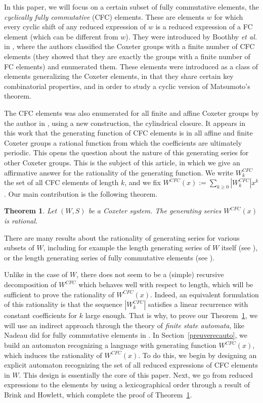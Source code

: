 \documentclass[reqno,12pt]{amsart}
\newtheorem{Theorem}{Theorem}[section]
\theoremstyle{definition}
\begin{document}
 In this paper, we will focus on a certain subset of fully commutative elements, the \emph{cyclically fully commutative} (CFC) elements. These are elements $w$ for which every cyclic shift of any reduced expression of $w$ is a reduced expression of a FC element (which can be different from $w$).  They were introduced by Boothby \emph{et al.} in \cite{BBEEGM}, where the authors classified the Coxeter groups with a finite number of CFC elements (they showed that they are exactly the groups with a finite number of FC elements) and enumerated them.  These elements were introduced as a class of elements generalizing the Coxeter elements, in that they share certain key combinatorial properties, and in order to study a cyclic version of Matsumoto's theorem.
 
The CFC elements was also enumerated for all finite and affine Coxeter groups by the author in \cite{PET4}, using a new construction, the cylindrical closure. It appears in this work that the generating function of CFC elements is in all affine and finite Coxeter groups a rational function from which the coefficients are ultimately periodic. This opens the question about the nature of this generating series for other Coxeter groups. This is the subject of this article, in which we give an affirmative answer for the rationality of the generating function. We write $W^{CFC}_k$ the set of all CFC elements of length $k$, and we fix $W^{CFC}(x):= \sum_{k \geq 0} |W^{CFC}_k|x^k$. Our main contribution is the following theorem.

\begin{Theorem}\label{thmintro}
Let $(W,S)$ be a Coxeter system. The generating series $W^{CFC}(x)$ is rational.
\end{Theorem}

There are many results about the rationality of generating series for various subsets of $W$, including for example the length generating series of $W$ itself (see \cite[Section 7.1]{BB}), or the length generating series of  fully commutative elements (see \cite[Theorem 1.1]{NAD}).

Unlike in the case of $W$, there does not seem to be a (simple) recursive decomposition of $W^{CFC}$ which behaves well with respect to length, which will be sufficient to prove the rationality of $W^{CFC}(x)$. Indeed, an equivalent formulation of this rationality is that the sequence $|W^{CFC}_k|$ satisfies a linear recurrence with constant coefficients for $k$ large enough. That is why, to prove our Theorem~\ref{thmintro}, we will use an indirect approach through the theory of \emph{finite state automata}, like Nadeau did for fully commutative elements in \cite{NAD}. In Section~\ref{preuverecauto}, we build an automaton recognizing a language with generating function $W^{CFC}(x)$, which induces the rationality of $W^{CFC}(x)$. To do this, we begin by designing an explicit automaton recognizing the set of all reduced expressions of CFC elements in $W$. This design is essentially the core of this paper. Next, we go from reduced expressions to the elements by using a lexicographical order through a result of Brink and Howlett, which complete the proof of Theorem~\ref{thmintro}.
\end{document}
